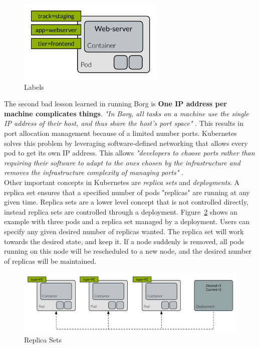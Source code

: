 \begin{figure}[H]
    \centering
    \includegraphics[width=7cm]{figures/kubernetes/labels}
    \caption{Labels}
    \label{fig:labels_report}
\end{figure}

\noindent
The second bad lesson learned in running Borg is \textbf{One IP address per machine complicates things}. \textit{"In Borg, all tasks on a machine use the single IP address of their host, and thus share the host's port space"}  \cite[p. 14]{verma2015borg}. This results in port allocation management because of a limited number ports. Kubernetes solves this problem by leveraging software-defined networking that allows every pod to get its own IP address. This allows \textit{"developers to choose ports rather than requiring their software to adapt to the ones chosen by the infrastructure and removes the infrastructure complexity of managing ports"} \cite[p. 13]{verma2015borg}. \\


\noindent
Other important concepts in Kubernetes are \textit{replica sets} and \textit{deployments}. A replica set ensures that a specified number of pods "replicas" are running at any given time. Replica sets are a lower level concept that is not controlled directly, instead replica sets are controlled through a deployment. Figure~\ref{fig:replica_sets_report} shows an example with three pods and a replica set managed by a deployment. Users can specify any given desired number of replicas wanted. The replica set will work towards the desired state, and keep it. If a node suddenly is removed, all pods running on this node will be rescheduled to a new node, and the desired number of replicas will be maintained.

\begin{figure}[H]
    \centering
    \includegraphics[width=15cm]{figures/kubernetes/replica_sets}
    \caption{Replica Sets}
    \label{fig:replica_sets_report}
\end{figure}

